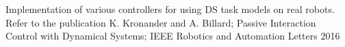 Implementation of various controllers for using D\+S task models on real robots. Refer to the publication K. Kronander and A. Billard; Passive Interaction Control with Dynamical Systems; I\+E\+E\+E Robotics and Automation Letters 2016 